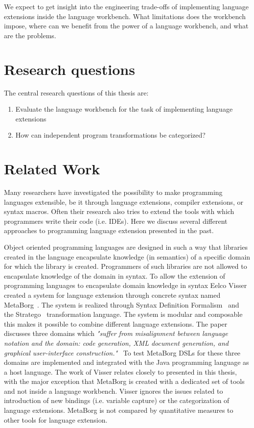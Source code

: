 We expect to get insight into the engineering trade-offs of implementing language extensions inside the language workbench. What limitations does the workbench impose, where can we benefit from the power of a language workbench, and what are the problems.

\section{Research questions}
The central research questions of this thesis are:

\begin{enumerate}
	\item Evaluate the language workbench for the task of implementing language extensions
	\item How can independent program transformations be categorized?	
\end{enumerate}

\section{Related Work} \label{sec:related}
Many researchers have investigated the possibility to make programming languages extensible, be it through language extensions, compiler extensions, or syntax macros. Often their research also tries to extend the tools with which programmers write their code (i.e. IDEs). Here we discuss several different approaches to programming language extension presented in the past.

Object oriented programming languages are designed in such a way that libraries created in the language encapsulate knowledge (in semantics) of a specific domain for which the library is created. Programmers of such libraries are not allowed to encapsulate knowledge of the domain in syntax. To allow the extension of programming languages to encapsulate domain knowledge in syntax Eelco Visser created a system for language extension through concrete syntax named MetaBorg~\cite{Visser20024}. The system is realized through Syntax Definition Formalism~\cite{Heering1989} and the Stratego~\cite{Visser2001a} transformation language. The system is modular and composable this makes it possible to combine different language extensions. The paper discusses three domains which \textit{"suffer from misalignment between language notation and the domain: code generation, XML document generation, and graphical user-interface construction."}~\cite{Visser20024} To test MetaBorg DSLs for these three domains are implemented and integrated with the Java programming language as a host language. The work of Visser relates closely to \projectname presented in this thesis, with the major exception that MetaBorg is created with a dedicated set of tools and not inside a language workbench. Visser ignores the issues related to introduction of new bindings (i.e. variable capture) or the categorization of language extensions. MetaBorg is not compared by quantitative measures to other tools for language extension.

